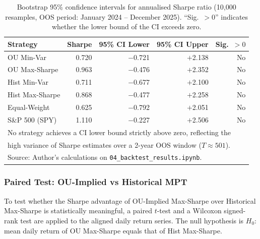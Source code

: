 \documentclass[a4paper]{report}
\begin{document}
\begin{table}[htbp]
\centering
\caption{Bootstrap 95\% confidence intervals for annualised Sharpe ratio (10{,}000 resamples,
OOS period: January 2024 -- December 2025). ``Sig.\ $> 0$'' indicates whether the lower bound
of the CI exceeds zero.}
\label{tab:bootstrap_sharpe}
\begin{tabular}{lrrrr}
\toprule
Strategy & Sharpe & 95\% CI Lower & 95\% CI Upper & Sig.\ $> 0$ \\
\midrule
OU Min-Var          & 0.720 & $-$0.721 & $+$2.138 & No \\
OU Max-Sharpe       & 0.963 & $-$0.476 & $+$2.352 & No \\
Hist Min-Var        & 0.711 & $-$0.677 & $+$2.100 & No \\
Hist Max-Sharpe     & 0.868 & $-$0.477 & $+$2.258 & No \\
Equal-Weight        & 0.625 & $-$0.792 & $+$2.051 & No \\
S\&P 500 (SPY)      & 1.110 & $-$0.227 & $+$2.506 & No \\
\bottomrule
\multicolumn{5}{l}{\small No strategy achieves a CI lower bound strictly above zero, reflecting the} \\
\multicolumn{5}{l}{\small high variance of Sharpe estimates over a 2-year OOS window ($T \approx 501$).} \\
\multicolumn{5}{l}{\small Source: Author's calculations on \texttt{04\_backtest\_results.ipynb}.}
\end{tabular}
\end{table}

\subsubsection{Paired Test: OU-Implied vs Historical MPT}

To test whether the Sharpe advantage of OU-Implied Max-Sharpe over Historical Max-Sharpe
is statistically meaningful, a paired $t$-test and a Wilcoxon signed-rank test are applied
to the aligned daily return series. The null hypothesis is $H_0$: mean daily return
of OU Max-Sharpe equals that of Hist Max-Sharpe.
\end{document}
